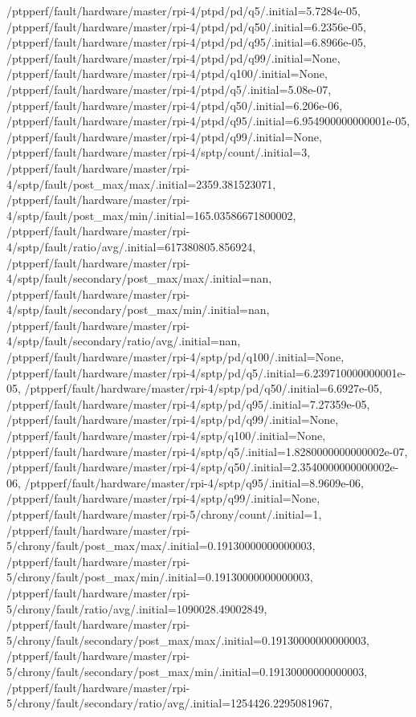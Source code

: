 {    /ptpperf/fault/hardware/master/rpi-4/ptpd/pd/q5/.initial=5.7284e-05,
    /ptpperf/fault/hardware/master/rpi-4/ptpd/pd/q50/.initial=6.2356e-05,
    /ptpperf/fault/hardware/master/rpi-4/ptpd/pd/q95/.initial=6.8966e-05,
    /ptpperf/fault/hardware/master/rpi-4/ptpd/pd/q99/.initial=None,
    /ptpperf/fault/hardware/master/rpi-4/ptpd/q100/.initial=None,
    /ptpperf/fault/hardware/master/rpi-4/ptpd/q5/.initial=5.08e-07,
    /ptpperf/fault/hardware/master/rpi-4/ptpd/q50/.initial=6.206e-06,
    /ptpperf/fault/hardware/master/rpi-4/ptpd/q95/.initial=6.954900000000001e-05,
    /ptpperf/fault/hardware/master/rpi-4/ptpd/q99/.initial=None,
    /ptpperf/fault/hardware/master/rpi-4/sptp/count/.initial=3,
    /ptpperf/fault/hardware/master/rpi-4/sptp/fault/post_max/max/.initial=2359.381523071,
    /ptpperf/fault/hardware/master/rpi-4/sptp/fault/post_max/min/.initial=165.03586671800002,
    /ptpperf/fault/hardware/master/rpi-4/sptp/fault/ratio/avg/.initial=617380805.856924,
    /ptpperf/fault/hardware/master/rpi-4/sptp/fault/secondary/post_max/max/.initial=nan,
    /ptpperf/fault/hardware/master/rpi-4/sptp/fault/secondary/post_max/min/.initial=nan,
    /ptpperf/fault/hardware/master/rpi-4/sptp/fault/secondary/ratio/avg/.initial=nan,
    /ptpperf/fault/hardware/master/rpi-4/sptp/pd/q100/.initial=None,
    /ptpperf/fault/hardware/master/rpi-4/sptp/pd/q5/.initial=6.239710000000001e-05,
    /ptpperf/fault/hardware/master/rpi-4/sptp/pd/q50/.initial=6.6927e-05,
    /ptpperf/fault/hardware/master/rpi-4/sptp/pd/q95/.initial=7.27359e-05,
    /ptpperf/fault/hardware/master/rpi-4/sptp/pd/q99/.initial=None,
    /ptpperf/fault/hardware/master/rpi-4/sptp/q100/.initial=None,
    /ptpperf/fault/hardware/master/rpi-4/sptp/q5/.initial=1.8280000000000002e-07,
    /ptpperf/fault/hardware/master/rpi-4/sptp/q50/.initial=2.3540000000000002e-06,
    /ptpperf/fault/hardware/master/rpi-4/sptp/q95/.initial=8.9609e-06,
    /ptpperf/fault/hardware/master/rpi-4/sptp/q99/.initial=None,
    /ptpperf/fault/hardware/master/rpi-5/chrony/count/.initial=1,
    /ptpperf/fault/hardware/master/rpi-5/chrony/fault/post_max/max/.initial=0.19130000000000003,
    /ptpperf/fault/hardware/master/rpi-5/chrony/fault/post_max/min/.initial=0.19130000000000003,
    /ptpperf/fault/hardware/master/rpi-5/chrony/fault/ratio/avg/.initial=1090028.49002849,
    /ptpperf/fault/hardware/master/rpi-5/chrony/fault/secondary/post_max/max/.initial=0.19130000000000003,
    /ptpperf/fault/hardware/master/rpi-5/chrony/fault/secondary/post_max/min/.initial=0.19130000000000003,
    /ptpperf/fault/hardware/master/rpi-5/chrony/fault/secondary/ratio/avg/.initial=1254426.2295081967,
}

